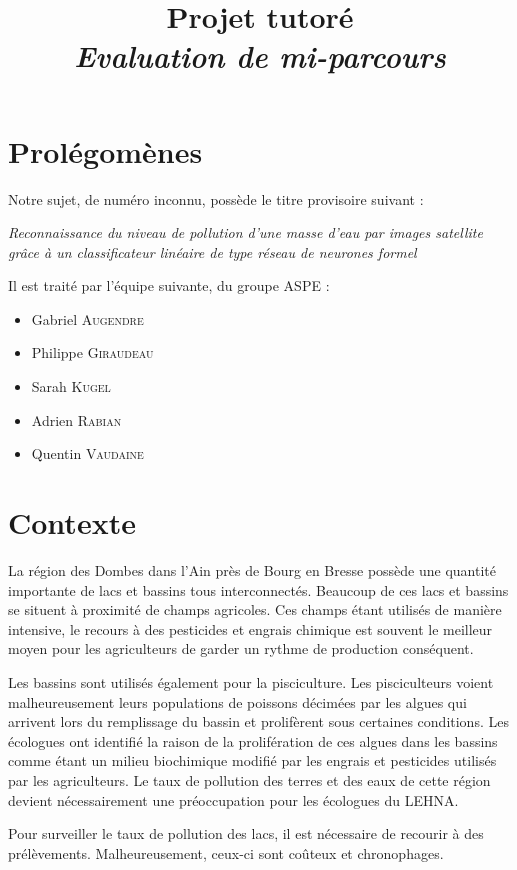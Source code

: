 \documentclass[a4paper, 12pt]{article}
\title{Projet tutoré \\ \small\textit{Evaluation de mi-parcours}}
\begin{document}
\maketitle

\section{Prolégomènes}
Notre sujet, de numéro inconnu, possède le titre provisoire suivant :
\begin{center}
	\emph{\og Reconnaissance du niveau de pollution d’une masse d’eau par images satellite grâce à un classificateur linéaire de type réseau de neurones formel \fg}
\end{center}
Il est traité par l'équipe suivante, du groupe ASPE :
\vspace{0.3cm}
\begin{itemize}
	\item Gabriel \textsc{Augendre}
	\item Philippe \textsc{Giraudeau}
	\item Sarah \textsc{Kugel}
	\item Adrien \textsc{Rabian}
	\item Quentin \textsc{Vaudaine}
\end{itemize}

\section{Contexte}
La région des Dombes dans l'Ain près de Bourg en Bresse possède une quantité importante de lacs et bassins tous interconnectés. Beaucoup de ces lacs et bassins se situent à proximité de champs agricoles. Ces champs étant utilisés de manière intensive, le recours à des pesticides et engrais chimique est souvent le meilleur moyen pour les agriculteurs de garder un rythme de production conséquent.

Les bassins sont utilisés également pour la pisciculture. Les pisciculteurs voient malheureusement  leurs populations de poissons décimées par les algues qui arrivent lors du remplissage du bassin et prolifèrent sous certaines conditions. Les écologues ont identifié la raison de la prolifération de ces algues dans les bassins comme étant un milieu biochimique modifié par les engrais et pesticides utilisés par les agriculteurs. Le taux de pollution des terres et des eaux de cette région devient nécessairement une préoccupation pour les écologues du LEHNA.

Pour surveiller le taux de pollution des lacs, il est nécessaire de recourir à des prélèvements. Malheureusement, ceux-ci sont coûteux et chronophages.
\end{document}
